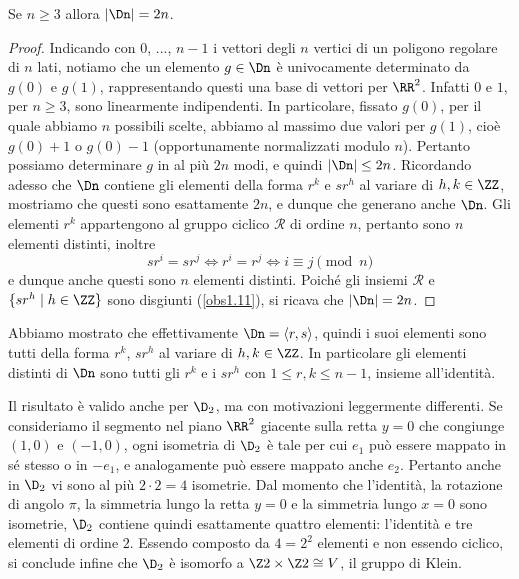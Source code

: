 \documentclass[11pt]{scrartcl}
\begin{document}
	\begin{proposition}
		Se $n \geq 3$ allora $\lvert \Dn \rvert = 2n$.
	\end{proposition}
	
	\begin{proof}
		Indicando con $0$, ..., $n-1$ i vettori degli $n$ vertici di un poligono regolare di $n$ lati, notiamo
		che un elemento $g \in \Dn$ è univocamente determinato da $g(0)$ e $g(1)$, rappresentando
		questi una base di vettori per $\RR^2$. Infatti $0$ e $1$, per $n \geq 3$, sono
		linearmente indipendenti.
		In particolare, fissato $g(0)$, per il quale abbiamo $n$ possibili scelte,
		abbiamo al massimo due valori per $g(1)$, cioè $g(0) + 1$ o $g(0) - 1$ (opportunamente
		normalizzati modulo $n$). Pertanto possiamo determinare $g$ in al più $2n$ modi, e quindi 
		$\lvert \Dn \rvert \leq 2n$. Ricordando adesso che $\Dn$ contiene gli elementi
		della forma $r^k$ e $sr^h$ al variare di $h, k \in \ZZ$, mostriamo che questi sono 
		esattamente $2n$, e dunque che generano anche $\Dn$. Gli elementi $r^k$ appartengono al gruppo ciclico $\mathcal{R}$
		di ordine $n$, pertanto sono $n$ elementi distinti, inoltre 
		\[
		sr^i = sr^j \iff r^i = r^j\iff i \equiv j \pmod n
		\] e dunque anche questi sono $n$
		elementi distinti. Poiché gli insiemi $\mathcal{R}$ e 
		$\{sr^h\mid h \in \ZZ\}$ sono disgiunti (\autoref{obs1.11}), 
		si ricava che $\lvert \Dn \rvert = 2n$.
	\end{proof}
	
	\begin{remark}
		Abbiamo mostrato che effettivamente $\Dn = \langle r, s\rangle$, quindi i
		suoi elementi sono tutti della forma $r^k$, $sr^h$ al variare di $h, k \in \ZZ$. In
		particolare gli elementi distinti di $\Dn$ sono tutti gli $r^k$ e i $sr^h$ con
		$1 \leq r, k \leq n-1$, insieme all'identità.
	\end{remark}
	
	\begin{remark}
		Il risultato è valido anche per $\D_2$, ma con motivazioni leggermente differenti. 
		Se consideriamo il segmento nel piano $\RR^2$ giacente sulla retta $y = 0$ che
		congiunge $(1, 0)$ e $(-1, 0)$, ogni isometria di $\D_2$ è tale per cui
		$e_1$ può essere mappato in sé stesso o in $-e_1$, e analogamente può essere
		mappato anche $e_2$. Pertanto anche in $\D_2$ vi sono al più $2 \cdot 2 = 4$
		isometrie. Dal momento che l'identità, la rotazione di 
		angolo $\pi$, la simmetria lungo la retta $y = 0$ e la simmetria lungo $x=0$ sono
		isometrie,
		$\D_2$ contiene quindi esattamente quattro elementi:
		l'identità e tre elementi di ordine $2$. Essendo composto da $4 = 2^2$ elementi
		e non essendo ciclico, si conclude infine che
		$\D_2$ è isomorfo a $\Z2\times\Z2 \cong V$,
		il gruppo di Klein.
	\end{remark}
	
\end{document}
